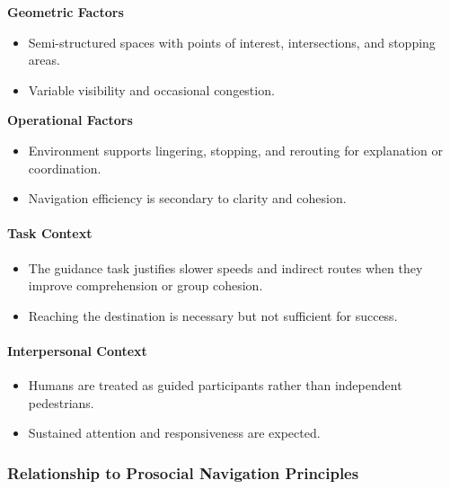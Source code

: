 \documentclass[utf8]{frontiers_suppmat} %
\providecommand{\tightlist}{%
  \setlength{\itemsep}{0pt}\setlength{\parskip}{0pt}}
\begin{document}
\textbf{Geometric Factors}

\begin{itemize}
\tightlist
\item
  Semi-structured spaces with points of interest, intersections, and
  stopping areas.
\item
  Variable visibility and occasional congestion.
\end{itemize}

\textbf{Operational Factors}

\begin{itemize}
\tightlist
\item
  Environment supports lingering, stopping, and rerouting for
  explanation or coordination.
\item
  Navigation efficiency is secondary to clarity and cohesion.
\end{itemize}

\paragraph{Task Context}\label{task-context}

\begin{itemize}
\tightlist
\item
  The guidance task justifies slower speeds and indirect routes when
  they improve comprehension or group cohesion.
\item
  Reaching the destination is necessary but not sufficient for success.
\end{itemize}

\paragraph{Interpersonal Context}\label{interpersonal-context}

\begin{itemize}
\tightlist
\item
  Humans are treated as guided participants rather than independent
  pedestrians.
\item
  Sustained attention and responsiveness are expected.
\end{itemize}

\subsubsection{Relationship to Prosocial Navigation
Principles}\label{relationship-to-prosocial-navigation-principles}
\end{document}
